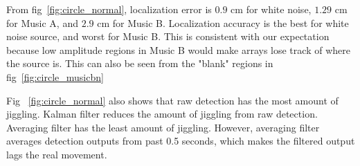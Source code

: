 From fig~\ref{fig:circle_normal}, localization error is $0.9$ cm for white noise, $1.29$ cm for Music A, and $2.9$ cm for Music B. Localization accuracy is the best for white noise source, and worst for Music B. This is consistent with our expectation because low amplitude regions in Music B would make arrays lose track of where the source is. This can also be seen from the "blank" regions in fig~\ref{fig:circle_musicbn} 

Fig ~\ref{fig:circle_normal} also shows that raw detection has the most amount of jiggling. Kalman filter reduces the amount of jiggling from raw detection. Averaging filter has the least amount of jiggling. However, averaging filter averages detection outputs from past 0.5 seconds, which makes the filtered output lags the real movement. 

